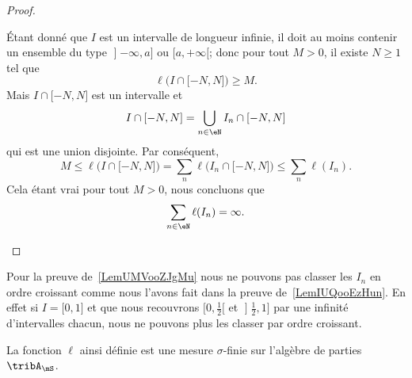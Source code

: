 \begin{proof}
\begin{subproof}

		Étant donné que \( I\) est un intervalle de longueur infinie, il doit au moins contenir un ensemble du type \( \mathopen] -\infty , a \mathclose]\) ou \( \mathopen[ a , +\infty [\); donc  pour tout \( M>0\), il existe \( N\geq 1\) tel que
		\begin{equation}
			\ell\big( I\cap\mathopen[ -N , N \mathclose] \big)\geq M.
		\end{equation}
		Mais \( I\cap\mathopen[ -N , N \mathclose]\) est un intervalle et
		\begin{equation}
			I\cap\mathopen[ -N , N \mathclose]=\bigcup_{n\in \eN}I_n\cap\mathopen[ -N , N \mathclose]
		\end{equation}
		qui est une union disjointe. Par conséquent,
		\begin{equation}
			M\leq \ell\big( I\cap\mathopen[ -N , N \mathclose] \big)=\sum_n\ell\big( I_n\cap\mathopen[ -N , N \mathclose] \big)\leq\sum_n\ell(I_n).
		\end{equation}
		Cela étant vrai pour tout \( M>0\), nous concluons que
		\begin{equation}
			\sum_{n\in \eN}\ell(I_n)=\infty.
		\end{equation}
	\end{subproof}
\end{proof}

\begin{remark}
	Pour la preuve de~\ref{LemUMVooZJgMu} nous ne pouvons pas classer les \( I_n\) en ordre croissant comme nous l'avons fait dans la preuve de~\ref{LemIUQooEzHun}. En effet si \( I=\mathopen[ 0 , 1 \mathclose]\) et que nous recouvrons \( \mathopen[ 0 , \frac{ 1 }{2} [\) et \( \mathopen] \frac{ 1 }{2} , 1 \mathclose]\) par une infinité d'intervalles chacun, nous ne pouvons plus les classer par ordre croissant.
\end{remark}

\begin{proposition}     \label{PropULFoodgXrR}
	La fonction \( \ell\) ainsi définie est une mesure \( \sigma\)-finie sur l'algèbre de parties \( \tribA_{\mS}\).
\end{proposition}

